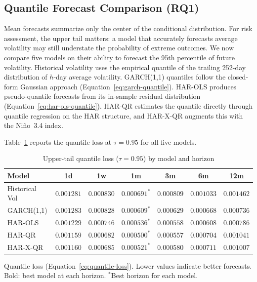 \subsection{Quantile Forecast Comparison (RQ1)}
\label{sec:res-har-qr}

Mean forecasts summarize only the center of the conditional distribution.
For risk assessment, the upper tail matters: a model that accurately forecasts
average volatility may still understate the probability of extreme outcomes.
We now compare five models on their ability to forecast the 95th percentile
of future volatility. Historical volatility uses the empirical quantile of
the trailing 252-day distribution of $h$-day average volatility. GARCH(1,1)
quantiles follow the closed-form Gaussian approach
(Equation~\ref{eq:garch-quantile}). HAR-OLS produces pseudo-quantile
forecasts from its in-sample residual distribution
(Equation~\ref{eq:har-ols-quantile}). HAR-QR estimates the quantile directly
through quantile regression on the HAR structure, and HAR-X-QR augments
this with the Ni\~no~3.4 index.

Table~\ref{tab:upper-qlike-comparison} reports the quantile loss at
$\tau = 0.95$ for all five models.

\begin{table}[htbp]
\centering
\small
\caption{Upper-tail quantile loss ($\tau = 0.95$) by model and horizon}
\label{tab:upper-qlike-comparison}
\begin{tabular}{lcccccc}
\toprule
Model & 1d & 1w & 1m & 3m & 6m & 12m \\
\midrule
Historical Vol    & $0.001281$ & $0.000830$ & $0.000691^{*}$ & $0.000809$ & $0.001033$ & $0.001462$ \\
GARCH(1,1)        & $0.001283$ & $0.000828$ & $0.000609^{*}$ & $0.000629$ & $0.000668$ & $\mathbf{0.000736}$ \\
HAR-OLS           & $0.001229$ & $0.000746$ & $0.000536^{*}$ & $0.000558$ & $\mathbf{0.000608}$ & $0.000786$ \\
HAR-QR            & $\mathbf{0.001159}$ & $\mathbf{0.000682}$ & $\mathbf{0.000500}^{*}$ & $\mathbf{0.000557}$ & $0.000704$ & $0.001041$ \\
HAR-X-QR          & $0.001160$ & $0.000685$ & $0.000521^{*}$ & $0.000580$ & $0.000711$ & $0.001007$ \\
\bottomrule
\end{tabular}
\par\smallskip
{\footnotesize Quantile loss (Equation~\eqref{eq:quantile-loss}). Lower values indicate better forecasts. Bold: best model at each horizon. $^{*}$Best horizon for each model.}
\end{table}


